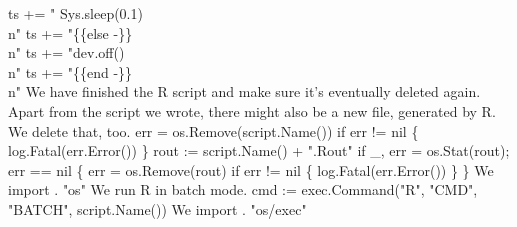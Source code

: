 ts += "    Sys.sleep(0.1)\\n"
ts += "\{\{else -\}\}\\n"
ts += "dev.off()\\n"
ts += "\{\{end -\}\}\\n"
\nwendcode{}\nwdocspar
We have finished the R script and make sure it's eventually deleted
again. Apart from the script we wrote, there might also be a new file,
 generated by R. We delete that, too.
\nwenddocs{}\endmoddef\nwstartdeflinemarkup{}\nwenddeflinemarkup
err = os.Remove(script.Name())
if err != nil \{
          log.Fatal(err.Error())
\}
rout := script.Name() + ".Rout"
if _, err = os.Stat(rout); err == nil \{
          err = os.Remove(rout)
          if err != nil \{
                  log.Fatal(err.Error())
          \}
\}
\nwendcode{}\nwdocspar
We import .
\nwenddocs{}\plusendmoddef\nwstartdeflinemarkup{}\nwenddeflinemarkup
"os"
\nwendcode{}\nwdocspar
We run R in batch mode.
\nwenddocs{}\endmoddef\nwstartdeflinemarkup{}\nwenddeflinemarkup
cmd := exec.Command("R", "CMD", "BATCH", script.Name())
\nwendcode{}\nwdocspar
We import .
\nwenddocs{}\plusendmoddef\nwstartdeflinemarkup{}\nwenddeflinemarkup
"os/exec"
